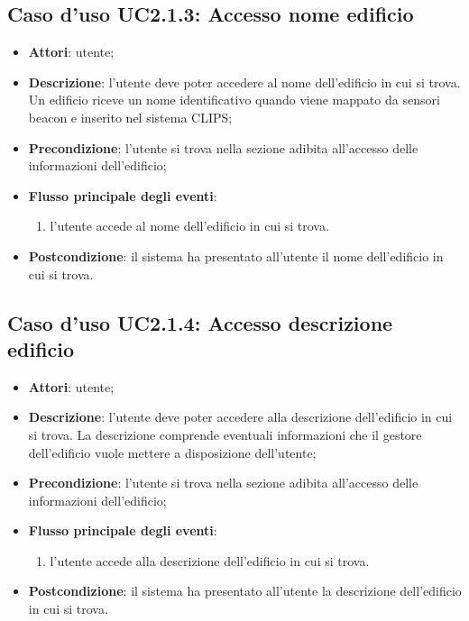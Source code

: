 \documentclass[../AnalisiDeiRequisiti.tex]{subfiles}
\begin{document}
\subsection{Caso d'uso UC2.1.3: Accesso nome edificio}
\begin{itemize}
	\item \textbf{Attori}: utente;
	\item \textbf{Descrizione}: l'utente deve poter accedere al nome dell'edificio in cui si trova. Un edificio riceve un nome identificativo quando viene mappato da sensori beacon e inserito nel sistema CLIPS; 
	\item \textbf{Precondizione}: l'utente si trova nella sezione adibita all'accesso delle informazioni dell'edificio;
	
	\item \textbf{Flusso principale degli eventi}:
	\begin{enumerate}
		\item l'utente accede al nome dell'edificio in cui si trova.
		
	\end{enumerate}
	\item \textbf{Postcondizione}: il sistema ha presentato all'utente il nome dell'edificio in cui si trova.
\end{itemize}
\hypertarget{UC2.1.4}{}
\subsection{Caso d'uso UC2.1.4: Accesso descrizione edificio}
\begin{itemize}
	\item \textbf{Attori}: utente;
	\item \textbf{Descrizione}: l'utente deve poter accedere alla descrizione dell'edificio in cui si trova. La descrizione comprende eventuali informazioni che il gestore dell'edificio vuole mettere a disposizione dell'utente; 
	\item \textbf{Precondizione}: l'utente si trova nella sezione adibita all'accesso delle informazioni dell'edificio;
	
	\item \textbf{Flusso principale degli eventi}:
	\begin{enumerate}
		\item l'utente accede alla descrizione dell'edificio in cui si trova.
		
	\end{enumerate}
	\item \textbf{Postcondizione}: il sistema ha presentato all'utente la descrizione dell'edificio in cui si trova.
\end{itemize}
\hypertarget{UC2.2}{}
\end{document}
